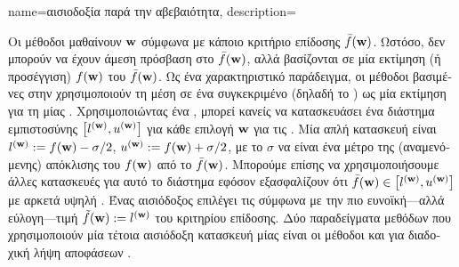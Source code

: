 {name={\foreignlanguage{greek}{αισιοδοξία παρά την αβεβαιότητα}},
	description={\foreignlanguage{greek}{Οι μέθοδοι}  
		\foreignlanguage{greek}{μαθαίνουν}  $\weights$ 
		\foreignlanguage{greek}{σύμφωνα με κάποιο κριτήριο επίδοσης $\bar{f}(\weights)$. Ωστόσο, δεν μπορούν να έχουν άμεση 
		πρόσβαση στο $\bar{f}(\weights)$, αλλά βασίζονται σε μία εκτίμηση (ή προσέγγιση) 
		$f(\weights)$ του $\bar{f}(\weights)$. Ως ένα χαρακτηριστικό παράδειγμα, οι μέθοδοι βασιμένες στην}   
		\foreignlanguage{greek}{χρησιμοποιούν τη μέση}  \foreignlanguage{greek}{σε ένα συγκεκριμένο}  
		\foreignlanguage{greek}{(δηλαδή το} ) \foreignlanguage{greek}{ως μία εκτίμηση για τη}  
		 \foreignlanguage{greek}{μίας} . \foreignlanguage{greek}{Χρησιμοποιώντας ένα} 
		, \foreignlanguage{greek}{μπορεί κανείς να κατασκευάσει ένα διάστημα εμπιστοσύνης  
		$\big[ l^{(\weights)},  u^{(\weights)} \big]$ για κάθε επιλογή $\weights$ για τις} .
		\foreignlanguage{greek}{Μία απλή κατασκευή είναι $l^{(\weights)} \defeq f(\weights) - \sigma/2$, $u^{(\weights)} \defeq f(\weights)+ \sigma/2$, 
	    	με το $\sigma$ να είναι ένα μέτρο της (αναμενόμενης) απόκλισης του $f(\weights)$ από το $\bar{f}(\weights)$.
		Μπορούμε επίσης να χρησιμοποιήσουμε άλλες κατασκευές για αυτό το διάστημα εφόσον εξασφαλίζουν ότι 
		$\bar{f}(\weights) \in\big[ l^{(\weights)},  u^{(\weights)} \big]$ 
		με αρκετά υψηλή} . \foreignlanguage{greek}{Ένας αισιόδοξος επιλέγει τις}  
		\foreignlanguage{greek}{σύμφωνα με την πιο ευνοϊκή—αλλά εύλογη—τιμή $\tilde{f}(\weights) \defeq  l^{(\weights)}$ 
		του κριτηρίου επίδοσης. Δύο παραδείγματα μεθόδων}  \foreignlanguage{greek}{που χρησιμοποιούν μία τέτοια 
		αισιόδοξη κατασκευή μίας}  \foreignlanguage{greek}{είναι οι μέθοδοι}  
		\cite[\foreignlanguage{greek}{Κεφ.} 11]{ShalevMLBook} \foreignlanguage{greek}{και}  \foreignlanguage{greek}{για διαδοχική 
		λήψη αποφάσεων} \cite[Sec. 2.2]{Bubeck2012}. 
		\begin{figure}[H]
			\begin{center}
			\begin{tikzpicture}[x=3cm, y=1cm]

\end{tikzpicture}
\end{center}
\end{figure}}}
